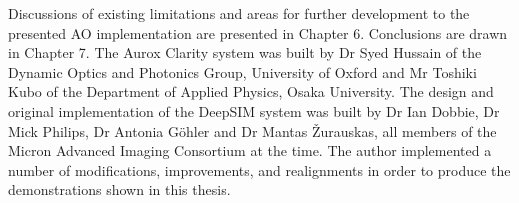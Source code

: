 Discussions of existing limitations and areas for further development to the 
presented AO implementation are presented in Chapter 6. Conclusions are drawn 
in Chapter 7. The Aurox Clarity system was built by Dr Syed Hussain of the 
Dynamic Optics and Photonics Group, University of Oxford and Mr Toshiki Kubo of the
Department of Applied Physics, Osaka University. The design and original 
implementation of the DeepSIM system was built by Dr Ian Dobbie, Dr Mick 
Philips, Dr Antonia G\"{o}hler and Dr Mantas \v{Z}urauskas, 
all members of the Micron Advanced Imaging Consortium at the time. The author 
implemented a number of modifications, improvements, and realignments in 
order to produce the demonstrations shown in this thesis.
